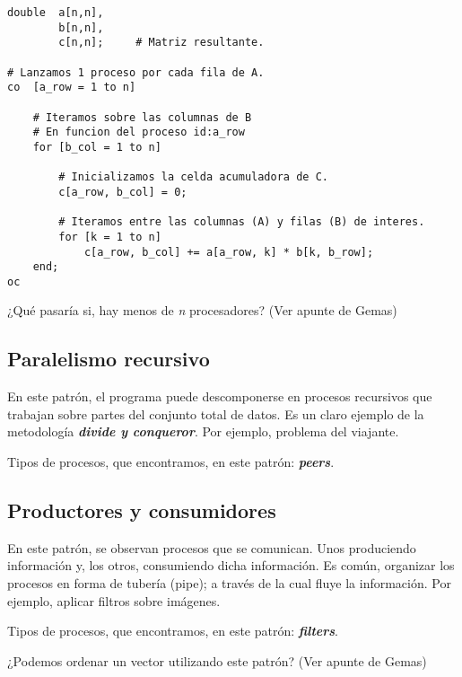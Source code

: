 \documentclass[a4paper, 10pt]{report}
\begin{document}
\begin{lstlisting}
double  a[n,n],
        b[n,n],
        c[n,n];     # Matriz resultante.

# Lanzamos 1 proceso por cada fila de A.
co  [a_row = 1 to n]

    # Iteramos sobre las columnas de B
    # En funcion del proceso id:a_row
    for [b_col = 1 to n]
        
        # Inicializamos la celda acumuladora de C.
        c[a_row, b_col] = 0;

        # Iteramos entre las columnas (A) y filas (B) de interes.
        for [k = 1 to n]
            c[a_row, b_col] += a[a_row, k] * b[k, b_row];
    end;
oc 
\end{lstlisting}

\begin{basic_box}
 ¿Qué pasaría si, hay menos de \emph{n} procesadores? (Ver apunte de Gemas)
\end{basic_box}



\subsection{Paralelismo recursivo}

En este patrón, el programa puede descomponerse en procesos recursivos que trabajan sobre partes del conjunto total de datos. Es un claro ejemplo de la metodología \textbf{\emph{divide y conqueror}}.
Por ejemplo, problema del viajante.

Tipos de procesos, que encontramos, en este patrón: \textbf{\emph{peers}}.

\subsection{Productores y consumidores}

En este patrón, se observan procesos que se comunican. Unos produciendo información y, los otros, consumiendo dicha información. Es común, organizar los procesos en forma de tubería (pipe); a través de la cual fluye la información.
Por ejemplo, aplicar filtros sobre imágenes.

Tipos de procesos, que encontramos, en este patrón: \textbf{\emph{filters}}.

\begin{basic_box}
     ¿Podemos ordenar un vector utilizando este patrón? (Ver apunte de Gemas)
\end{basic_box}
\end{document}
